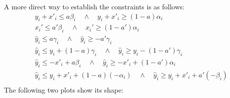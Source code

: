A more direct way to establish the constraints is as follows: \begin{align*}
	& y_i+x'_i \leq a\beta_i \quad\wedge \quad y_i+x'_i\geq (1-a)\alpha_i\\	
	& x_i' \leq a'\beta_i \quad\wedge \quad x_i'\geq (1-a')\alpha_i\\
	&\hat{y}_i \leq a\gamma_i \quad\wedge \quad	\hat{y}_i \geq -a'\gamma_i \\
	&	\hat{y}_i \leq y_i+(1-a)\gamma_i \quad\wedge \quad	\hat{y}_i \geq y_i - (1-a')\gamma_i \\
	&	\hat{y}_i \leq -x'_i+a\beta_i \quad\wedge \quad	\hat{y}_i \geq -x'_i+(1-a')\alpha_i \\
	&	\hat{y}_i \leq y_i+x'_i+(1-a)(-\alpha_i)\quad\wedge \quad	\hat{y}_i \geq y_i+x'_i+a'(-\beta_i) \\
\end{align*}The following two plots show its shape:

\iffalse
\hspace*{-10ex}
\begin{tikzpicture}
	\begin{axis}[	axis on top, xlabel = \(x'_i\),
		ylabel = {\(y_i\)}, zlabel = \(\hat{y}_i\),
				set layers=default,
	xmax = 4, xmin = -4,
ymax = 1, ymin = -1,		
zmax = 1, zmin = -1,
				unit vector ratio=1 1 1, scale=3,
				view={60}{50}, ytick   = {-1,0,1},
				yticklabels = {$-\gamma_i$,$0$,$\gamma_i$}, xtick = {0},
				xticklabels = {$0$}, ztick   = {-1,0,1},
				zticklabels = {$-\gamma_i$,$0$,$\gamma_i$},
				]
		\addplot3[fill=blue,opacity=0.1, fill opacity=0.4] 
		coordinates {
	 (0,0,0) (-1,1,0) (-4,1,0) (-4,-1,0) (0,-1,0) (0,0,0)
		};
		
		\addplot3[fill=blue,opacity=0.1, fill opacity=0.4	] 
		coordinates { (0,0,0) (0,1,1) (4, 1, 1) (4, -1, -1) (1,-1,-1) (0,0,0)
		};
		
		\addplot3[fill=blue,opacity=0.1, fill opacity=0.4	] 
		coordinates { (0,0,0)  (-1,1,0) (0,1,1) (0,0,0)
		};
		
			\addplot3[fill=blue,opacity=0.1, fill opacity=0.4	] 
		coordinates { (0,0,0)  (0,-1,0) (1,-1,-1) (0,0,0)
		};
		
		\addplot3[only marks, mark=*, mark size=2pt, blue] coordinates {(1,-1,-1)};
					\node[label={$(\gamma_i,-\gamma_i, -\gamma_i)$}] at (axis cs: 1.2, -0.5 ,-1) {};
					
			\addplot3[only marks, mark=*, mark size=2pt, blue] coordinates {(-1,1,0)};
		\node[label={$(-\gamma_i,\gamma_i, 0)$}] at (axis cs: -1, 0.8 ,0) {};			
		
	\end{axis}
\end{tikzpicture}
\fi


